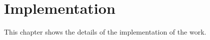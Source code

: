 \chapter{Implementation}
\label{c:implementation}

This chapter shows the details of the implementation of the work.


